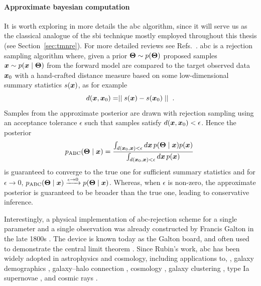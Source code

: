 \paragraph*{Approximate bayesian computation}
It is worth exploring in more details the \gls*{abc} algorithm, since it will serve us as the classical analogue of the \gls*{sbi} technique mostly employed throughout this thesis (see Section~\ref{sec:tmnre}). For more detailed reviews see Refs.~\cite{marin2012approximate, Sisson:2018aa, Grazian:2019aa}. \Gls*{abc} is a rejection sampling algorithm where, given a prior $\bm{\Theta}\sim p(\bm{\Theta})$ proposed samples $\bm{x} \sim p(\bm{x}\mid\bm{\Theta})$ from the forward model are compared to the target observed data $\bm{x}_0$ with a hand-crafted distance measure based on some low-dimensional summary statistics $s(\bm{x})$, as for example
\begin{equation}
    d(\bm{x}, \bm{x}_0)  = \mid\mid s(\bm{x}) - s(\bm{x}_0)\mid\mid\;.
\end{equation}
Samples from the approximate posterior are drawn with rejection sampling using an acceptance tolerance $\epsilon$ such that samples satisfy $d(\bm{x}, \bm{x}_0) < \epsilon$.
Hence the posterior
\begin{equation}
    p_\text{ABC}(\bm{\Theta}\mid\bm{x}) = \frac
    {\int_{d(\bm{x}_0, \bm{x}) < \epsilon} d\bm{x}\, p(\bm{\Theta}\mid\bm{x})p(\bm{x})}
    {\int_{d(\bm{x}_0, \bm{x}) < \epsilon} d\bm{x}\, p(\bm{x})} \;
\end{equation}
is guaranteed to converge to the true one for sufficient summary statistics and for $\epsilon \to 0$, $p_\text{ABC}(\bm{\Theta}\mid\bm{x}) \xrightarrow{\epsilon \to 0} p(\bm{\Theta}\mid\bm{x})$. Whereas, when $\epsilon$ is non-zero, the approximate posterior is guaranteed to be broader than the true one, leading to conservative inference. 

Interestingly, a physical implementation of \gls*{abc}-rejection scheme for a single parameter and a single observation was already constructed by Francis Galton in the late 1800s \cite[Figure 5]{stigler2010darwin}. The device is known today as the Galton board, and often used to demonstrate the central limit theorem \cite{galton1889natural}. Since Rubin's work, \gls*{abc} has been widely adopted in astrophysics and cosmology, including applications to, \eg, galaxy demographics \cite{cameron2012approximate}, galaxy–halo connection \cite{hahn2017approximate}, cosmology \cite{Akeret:2015uha, jennings2017astroabc}, galaxy clustering \cite{Ishida:2015wla}, type Ia supernovae \cite{Weyant:2012xe}, and cosmic rays \cite{bourriche2024beyond}.

